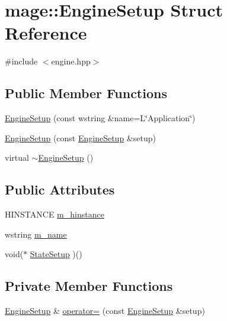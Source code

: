 \hypertarget{structmage_1_1_engine_setup}{}\section{mage\+:\+:Engine\+Setup Struct Reference}
\label{structmage_1_1_engine_setup}


{\ttfamily \#include $<$engine.\+hpp$>$}

\subsection*{Public Member Functions}
\begin{DoxyCompactItemize}
\item 
\hyperlink{structmage_1_1_engine_setup_a75ee36366d3035c9600e1dbe98973aa4}{Engine\+Setup} (const wstring \&name=L\char`\"{}Application\char`\"{})
\item 
\hyperlink{structmage_1_1_engine_setup_a2399c7966ed02ce9e9ab951b7483aac1}{Engine\+Setup} (const \hyperlink{structmage_1_1_engine_setup}{Engine\+Setup} \&setup)
\item 
virtual \hyperlink{structmage_1_1_engine_setup_a6a3a5afe40b976946699f69504b0a5e9}{$\sim$\+Engine\+Setup} ()
\end{DoxyCompactItemize}
\subsection*{Public Attributes}
\begin{DoxyCompactItemize}
\item 
H\+I\+N\+S\+T\+A\+N\+CE \hyperlink{structmage_1_1_engine_setup_af91461305cd9aa60e22fa770395d2238}{m\+\_\+hinstance}
\item 
wstring \hyperlink{structmage_1_1_engine_setup_a3866920e44c0752a89265f9f0c5c5d05}{m\+\_\+name}
\item 
void($\ast$ \hyperlink{structmage_1_1_engine_setup_a36a3c8a316c63e6c90ee9dd6efb82c0c}{State\+Setup} )()
\end{DoxyCompactItemize}
\subsection*{Private Member Functions}
\begin{DoxyCompactItemize}
\item 
\hyperlink{structmage_1_1_engine_setup}{Engine\+Setup} \& \hyperlink{structmage_1_1_engine_setup_aa4db9097cc627e5e543333b7f21f7cd6}{operator=} (const \hyperlink{structmage_1_1_engine_setup}{Engine\+Setup} \&setup)
\end{DoxyCompactItemize}



